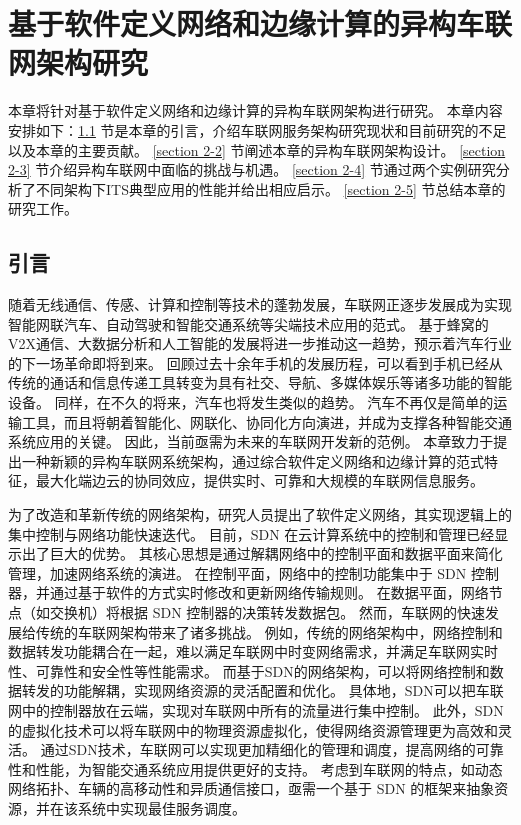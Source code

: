 \chapter{基于软件定义网络和边缘计算的异构车联网架构研究}
本章将针对基于软件定义网络和边缘计算的异构车联网架构进行研究。
本章内容安排如下：\ref{section 2-1} 节是本章的引言，介绍车联网服务架构研究现状和目前研究的不足以及本章的主要贡献。
\ref{section 2-2} 节阐述本章的异构车联网架构设计。
\ref{section 2-3} 节介绍异构车联网中面临的挑战与机遇。
\ref{section 2-4} 节通过两个实例研究分析了不同架构下ITS典型应用的性能并给出相应启示。
\ref{section 2-5} 节总结本章的研究工作。

\section{引言}\label{section 2-1}
随着无线通信、传感、计算和控制等技术的蓬勃发展，车联网正逐步发展成为实现智能网联汽车、自动驾驶和智能交通系统等尖端技术应用的范式。
基于蜂窝的V2X通信、大数据分析和人工智能的发展将进一步推动这一趋势，预示着汽车行业的下一场革命即将到来。
回顾过去十余年手机的发展历程，可以看到手机已经从传统的通话和信息传递工具转变为具有社交、导航、多媒体娱乐等诸多功能的智能设备。
同样，在不久的将来，汽车也将发生类似的趋势。
汽车不再仅是简单的运输工具，而且将朝着智能化、网联化、协同化方向演进，并成为支撑各种智能交通系统应用的关键。
因此，当前亟需为未来的车联网开发新的范例。
本章致力于提出一种新颖的异构车联网系统架构，通过综合软件定义网络和边缘计算的范式特征，最大化端边云的协同效应，提供实时、可靠和大规模的车联网信息服务。

为了改造和革新传统的网络架构，研究人员提出了软件定义网络\cite{wang2020ji}，其实现逻辑上的集中控制与网络功能快速迭代。
目前，SDN 在云计算系统中的控制和管理已经显示出了巨大的优势\cite{jain2013network}。
其核心思想是通过解耦网络中的控制平面和数据平面来简化管理，加速网络系统的演进。
在控制平面，网络中的控制功能集中于 SDN 控制器，并通过基于软件的方式实时修改和更新网络传输规则。
在数据平面，网络节点（如交换机）将根据 SDN 控制器的决策转发数据包。
然而，车联网的快速发展给传统的车联网架构带来了诸多挑战。
例如，传统的网络架构中，网络控制和数据转发功能耦合在一起，难以满足车联网中时变网络需求，并满足车联网实时性、可靠性和安全性等性能需求。
而基于SDN的网络架构，可以将网络控制和数据转发的功能解耦，实现网络资源的灵活配置和优化。
具体地，SDN可以把车联网中的控制器放在云端，实现对车联网中所有的流量进行集中控制。
此外，SDN的虚拟化技术可以将车联网中的物理资源虚拟化，使得网络资源管理更为高效和灵活。
通过SDN技术，车联网可以实现更加精细化的管理和调度，提高网络的可靠性和性能，为智能交通系统应用提供更好的支持。
考虑到车联网的特点，如动态网络拓扑、车辆的高移动性和异质通信接口，亟需一个基于 SDN 的框架来抽象资源，并在该系统中实现最佳服务调度。

